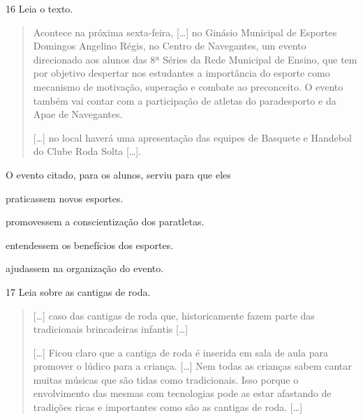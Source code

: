 \num{16} Leia o texto.
\begin{quote}\enlargethispage{\baselineskip}
  Acontece na próxima sexta-feira, {[}\ldots{}{]} no Ginásio Municipal de
  Esportes Domingos Angelino Régis, no Centro de Navegantes, um evento
  direcionado aos alunos das 8ª Séries da Rede Municipal de Ensino, que
  tem por objetivo despertar nos estudantes a importância do esporte
  como mecanismo de motivação, superação e combate ao preconceito. O
  evento também vai contar com a participação de atletas do paradesporto
  e da Apae de Navegantes.

{[}\ldots{}{]} no local haverá uma apresentação das equipes de Basquete e
Handebol do Clube Roda Solta {[}\ldots{}{]}.
\end{quote}


\noindent{}O evento citado, para os alunos, serviu para que eles

\begin{escolha}
\item praticassem novos esportes.

\item promovessem a conscientização dos paratletas.

\item entendessem os benefícios dos esportes.

\item ajudassem na organização do evento.
\end{escolha}



\num{17} Leia sobre as cantigas de roda.
\begin{quote}
  {[}\ldots{}{]} caso das cantigas de roda que, historicamente fazem parte
  das tradicionais brincadeiras infantis {[}\ldots{}{]}

{[}\ldots{}{]} Ficou claro que a cantiga de roda é inserida em sala de aula
para promover o lúdico para a criança. {[}\ldots{}{]} Nem todas as crianças
sabem cantar muitas músicas que são tidas como tradicionais. Isso porque
o envolvimento das mesmas com tecnologias pode as estar afastando de
tradições ricas e importantes como são as cantigas de roda. {[}\ldots{}{]}

\end{quote}

